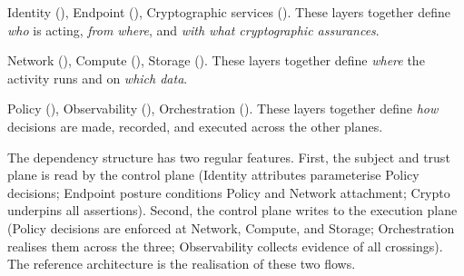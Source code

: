 \begin{description}[leftmargin=1.5em,style=nextline,nosep]
  \item[Subject and trust plane.] Identity (),
    Endpoint (), Cryptographic services
    (). These layers together define \emph{who}
    is acting, \emph{from where}, and \emph{with what cryptographic
    assurances}.
  \item[Execution plane.] Network (), Compute
    (), Storage (). These
    layers together define \emph{where} the activity runs and on
    \emph{which data}.
  \item[Control and governance plane.] Policy
    (), Observability
    (), Orchestration
    (). These layers together define
    \emph{how} decisions are made, recorded, and executed across the
    other planes.
\end{description}

The dependency structure has two regular features. First, the subject
and trust plane is read by the control plane (Identity attributes
parameterise Policy decisions; Endpoint posture conditions Policy and
Network attachment; Crypto underpins all assertions). Second, the
control plane writes to the execution plane (Policy decisions are
enforced at Network, Compute, and Storage; Orchestration realises
them across the three; Observability collects evidence of all
crossings). The reference architecture is the realisation of these two
flows.

